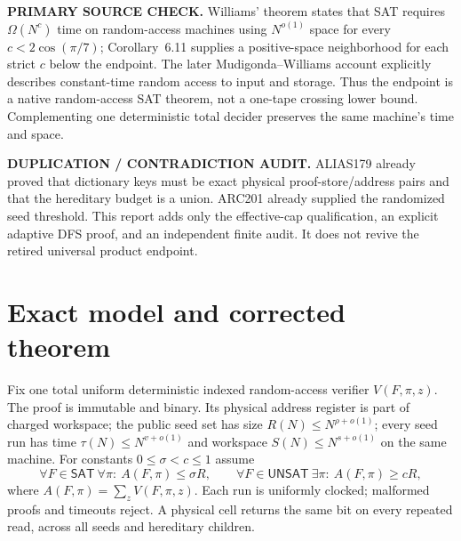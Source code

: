 \documentclass[11pt]{article}
\newcommand{\SAT}{\mathsf{SAT}}
\newcommand{\UNSAT}{\mathsf{UNSAT}}
\begin{document}
\textbf{PRIMARY SOURCE CHECK.} Williams' theorem states that SAT requires
$\Omega(N^c)$ time on random-access machines using $N^{o(1)}$ space for every
$c<2\cos(\pi/7)$; Corollary~6.11 supplies a positive-space neighborhood for
each strict $c$ below the endpoint\cite{williams}.  The later
Mudigonda--Williams account explicitly describes constant-time random access
to input and storage\cite{mw}.  Thus the endpoint is a native random-access
SAT theorem, not a one-tape crossing lower bound.  Complementing one
deterministic total decider preserves the same machine's time and space.

\textbf{DUPLICATION / CONTRADICTION AUDIT.} ALIAS179 already proved that
dictionary keys must be exact physical proof-store/address pairs and that
the hereditary budget is a union.  ARC201 already supplied the randomized
seed threshold.  This report adds only the effective-cap qualification,
an explicit adaptive DFS proof, and an independent finite audit.  It does
not revive the retired universal product endpoint.

\section{Exact model and corrected theorem}
Fix one total uniform deterministic indexed random-access verifier
$V(F,\pi,z)$.  The proof is immutable and binary.  Its physical address
register is part of charged workspace; the public seed set has size
$R(N)\le N^{\rho+o(1)}$; every seed run has time
$\tau(N)\le N^{v+o(1)}$ and workspace $S(N)\le N^{s+o(1)}$ on the same
machine.  For constants $0\le\sigma<c\le1$ assume
\[
 \forall F\in\SAT\ \forall\pi:\ A(F,\pi)\le\sigma R,
 \qquad
 \forall F\in\UNSAT\ \exists\pi:\ A(F,\pi)\ge cR,                 \tag{1}
\]
where $A(F,\pi)=\sum_zV(F,\pi,z)$.  Each run is uniformly clocked;
malformed proofs and timeouts reject.  A physical cell returns the same bit
on every repeated read, across all seeds and hereditary children.
\end{document}
